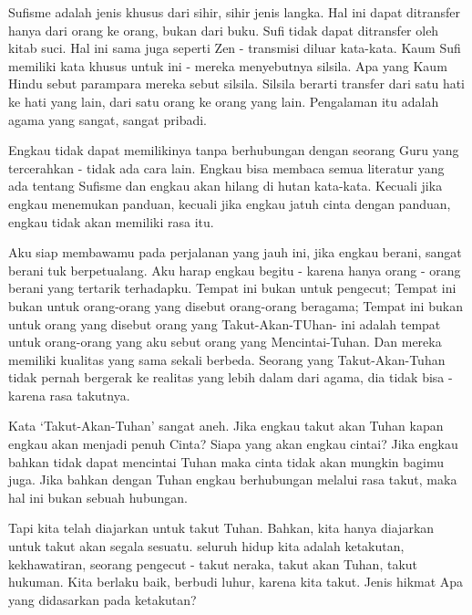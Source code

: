 Sufisme adalah jenis khusus dari sihir, sihir jenis langka. Hal ini dapat ditransfer hanya dari orang ke orang, bukan dari buku. Sufi tidak dapat ditransfer oleh kitab suci. Hal ini sama juga seperti Zen - transmisi diluar kata-kata. Kaum Sufi memiliki kata khusus untuk ini - mereka menyebutnya silsila. Apa yang Kaum Hindu sebut parampara mereka sebut silsila. Silsila berarti transfer dari satu hati ke hati yang lain, dari satu orang ke orang yang lain. Pengalaman itu adalah agama yang sangat, sangat  pribadi.

Engkau tidak dapat memilikinya tanpa berhubungan dengan seorang Guru yang tercerahkan - tidak ada cara lain. Engkau bisa membaca semua literatur yang ada tentang Sufisme dan engkau akan hilang di hutan kata-kata. Kecuali jika engkau menemukan panduan, kecuali jika engkau jatuh cinta dengan panduan, engkau tidak akan memiliki rasa itu.

Aku siap membawamu pada perjalanan yang jauh ini, jika engkau berani, sangat berani tuk berpetualang. Aku harap engkau begitu - karena hanya orang - orang berani yang tertarik terhadapku. Tempat ini bukan untuk pengecut; Tempat ini bukan untuk orang-orang yang disebut orang-orang beragama; Tempat ini bukan untuk orang yang disebut orang yang Takut-Akan-TUhan- ini adalah tempat untuk orang-orang yang aku sebut orang yang Mencintai-Tuhan. Dan mereka memiliki kualitas yang sama sekali berbeda. Seorang yang Takut-Akan-Tuhan tidak pernah bergerak ke realitas yang lebih dalam dari agama, dia tidak bisa - karena rasa takutnya.

Kata ‘Takut-Akan-Tuhan’ sangat aneh. Jika engkau takut akan Tuhan kapan engkau akan menjadi penuh Cinta? Siapa yang akan engkau cintai? Jika engkau bahkan tidak dapat mencintai Tuhan maka cinta tidak akan mungkin bagimu juga. Jika bahkan dengan Tuhan engkau berhubungan melalui rasa takut, maka hal ini bukan sebuah hubungan.

Tapi kita telah diajarkan untuk takut Tuhan. Bahkan, kita hanya diajarkan untuk takut akan segala sesuatu. seluruh hidup kita adalah ketakutan, kekhawatiran, seorang pengecut - takut neraka, takut akan Tuhan, takut hukuman. Kita berlaku baik, berbudi luhur, karena kita takut. Jenis hikmat Apa yang didasarkan pada ketakutan?

